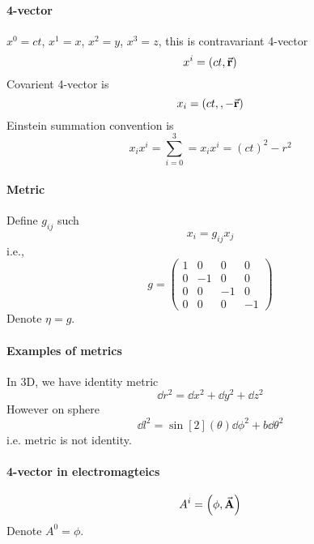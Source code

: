 \paragraph{4-vector}
$x^0=ct$, $x^1=x$, $x^2=y$, $x^3=z$, this is contravariant 4-vector
$$x^i = \qty(ct, \va{r})$$
Covarient 4-vector is
$$x_i = \qty(ct,, -\va{r})$$
Einstein summation convention is
$$x_ix^i = \sum_{i=0}^3 = x_ix^i = (ct)^2 - r^2$$
\paragraph{Metric}
Define $g_{ij}$ such 
$$x_i = g_{ij} x_j$$
i.e.,
$$g = \begin{pmatrix}
1&0&0&0\\
0&-1&0&0\\
0&0&-1&0\\
0&0&0&-1
\end{pmatrix}$$
Denote $\eta=g$.
\paragraph{Examples of metrics}
In 3D, we have identity metric
$$\dd{r^2} = \dd{x^2} + \dd{y^2} + \dd{z^2}$$
However on sphere 
$$\dd{l^2} = \sin[2](\theta) \dd{\phi^2} +b\dd{\theta^2}$$
i.e. metric is not identity.
\paragraph{4-vector in electromagteics}
$$A^i = \qty(\phi, \va{A})$$
Denote $A^0 = \phi$.
